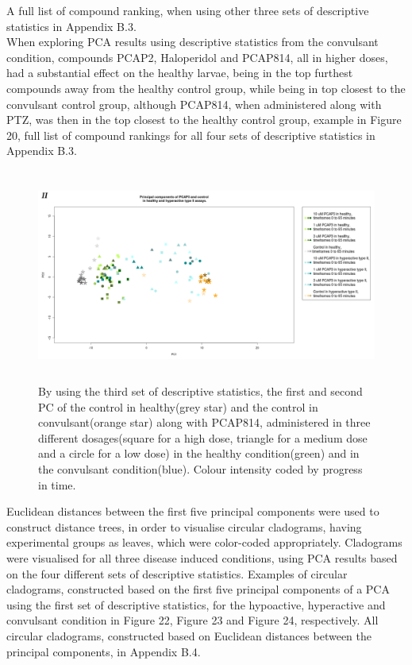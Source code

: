 \documentclass[a4paper,12pt]{article}
\begin{document}
A full list of compound ranking, when using other three sets of descriptive statistics in Appendix B.3.
\\
When exploring PCA results using descriptive statistics from the convulsant condition, compounds PCAP2, Haloperidol and PCAP814, all in higher doses, had a substantial effect on the healthy larvae, being in the top furthest compounds away from the healthy control group, while being in top closest to the convulsant control group, although PCAP814, when administered along with PTZ, was then in the top closest to the healthy control group, example in Figure 20, full list of compound rankings for all four sets of descriptive statistics in Appendix B.3.
\begin{figure}[h!]
\begin{center}
\includegraphics[width=14cm,height=7cm]{PCAP814_Control_DarkPTZ_stratified.png}
\caption{By using the third set of descriptive statistics, the first and second PC of the control in healthy(grey star) and the control in convulsant(orange star) along with PCAP814, administered in three different dosages(square for a high dose, triangle for a medium dose and a circle for a low dose) in the healthy condition(green) and in the convulsant condition(blue). Colour intensity coded by progress in time.}
\end{center}
\end{figure}
Euclidean distances between the first five principal components were used to construct distance trees, in order to visualise circular cladograms, having experimental groups as leaves, which were color-coded appropriately. Cladograms were visualised for all three disease induced conditions, using PCA results based on the four different sets of descriptive statistics. Examples of circular cladograms, constructed based on the first five principal components of a PCA using the first set of descriptive statistics, for the hypoactive, hyperactive and convulsant condition in Figure 22, Figure 23 and Figure 24, respectively. All circular cladograms, constructed based on Euclidean distances between the principal components, in Appendix B.4. 
\end{document}

